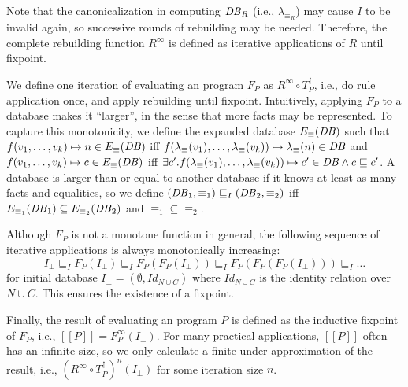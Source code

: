 \def\lfp{\mathit{lfp}}

Note that the canonicalization in computing $\mathit{DB}{}_R$ 
 (i.e., $\lambda_{\equiv_R}$) may cause $I$ to be invalid again,
 so successive rounds of rebuilding may be needed. 
Therefore, the complete rebuilding function $R^{\infty}$ 
 is defined as iterative applications of $R$ until fixpoint.

We define one iteration of evaluating 
 an \egglog program $F_P$ as $R^{\infty}\circ T^\uparrow_P$, i.e.,
 do rule application once, and apply rebuilding until fixpoint. 
Intuitively, applying $F_P$ to a database makes it ``larger'', 
 in the sense that more facts may be represented.
To capture this monotonicity, we define the expanded database 
 $E_{\equiv}(\mathit{DB}{})$
 such that 
 $f(v_1, \ldots, v_k)\mapsto n\in E_{\equiv}(\mathit{DB}{})$ iff
  $f(\lambda_{\equiv}(v_1),\ldots, \lambda_{\equiv}(v_k))\mapsto \lambda_{\equiv}(n)\in \mathit{DB}{}$
 and
 $f(v_1, \ldots, v_k)\mapsto c\in E_{\equiv}(\mathit{DB}{})$ iff
  $\exists c'. f(\lambda_{\equiv}(v_1),\ldots, \lambda_{\equiv}(v_k))\mapsto c'\in \mathit{DB}{}\land c\sqsubseteq c'$.
A database is larger than or equal to another database
 if it knows at least as many facts and equalities,
 so we define
 $(\mathit{DB}_1, \equiv_1)\sqsubseteq_I (\mathit{DB}_2, \equiv_2)$ iff
 $E_{\equiv_1}(\mathit{DB}_1)\subseteq E_{\equiv_2}(\mathit{DB}_2)$ 
 and
 $\equiv_1\subseteq\equiv_2$.

Although $F_P$ is not a monotone function in general,
the following sequence of iterative applications is always monotonically increasing:
\[
    I_{\bot}\sqsubseteq_I F_P(I_{\bot})\sqsubseteq_I F_P(F_P(I_{\bot}))\sqsubseteq_I  F_P(F_P(F_P(I_{\bot})))\sqsubseteq_I \ldots
\]
for initial database $I_{\bot}=(\emptyset, \textit{Id}_{N\cup C})$
where $\textit{Id}_{N\cup C}$ is the identity relation
over $N\cup C$. This ensures the existence of a fixpoint.

Finally, the result of evaluating an \egglog program $P$ is defined as the inductive fixpoint of $F_P$, 
 i.e., \(
    [\![P]\!]=F_P^{\infty}(I_{\bot})%
\).
For many practical applications, 
 $[\![P]\!]$ often has an infinite size, 
 so we only calculate a finite under-approximation of the result, 
 i.e., $(R^{\infty}\circ T^\uparrow_P)^n(I_\bot)$ for some iteration size $n$. 

